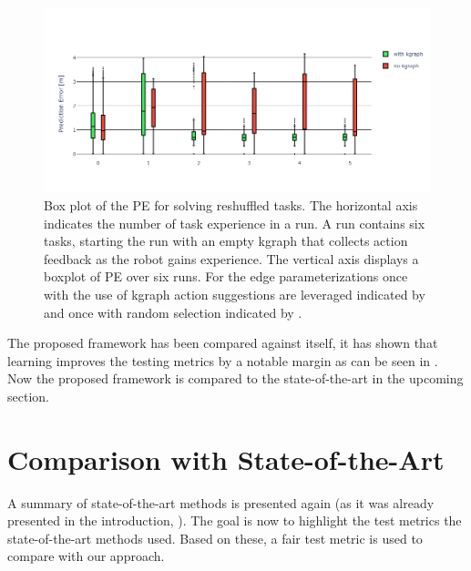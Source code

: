 \begin{figure}[H]
    \centering
    \includegraphics[width=\textwidth]{figures/results/random_push_pe_vs}
    \caption{Box plot of the \acl{PE} for solving reshuffled tasks. The horizontal axis indicates the number of task experience in a run. A run contains six tasks, starting the run with an empty \ac{kgraph} that collects action feedback as the robot gains experience. The vertical axis displays a boxplot of \acl{PE} over six runs. For the edge parameterizations once with the use of \ac{kgraph} action suggestions are leveraged indicated by  and once with random selection indicated by .}%
    \label{fig:random_push_pe_vs}
\end{figure}

The proposed framework has been compared against itself, it has shown that learning improves the testing metrics by a notable margin as can be seen in . Now the proposed framework is compared to the state-of-the-art in the upcoming section.\bs


\section{Comparison with State-of-the-Art}%
\label{sec:compare_with_related_papers}
A summary of state-of-the-art methods is presented again (as it was already presented in the introduction, ). The goal is now to highlight the test metrics the state-of-the-art methods used. Based on these, a fair test metric is used to compare with our approach.\bs

